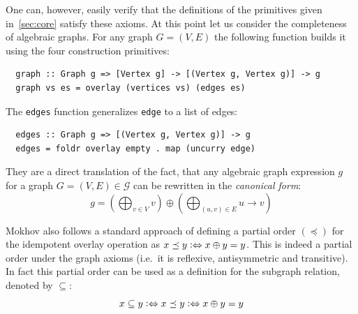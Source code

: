 \documentclass{article}
\newcommand{\hs}{\texttt}
\newcommand{\overlay}{\oplus}
\newcommand{\connect}{\rightarrow}
\begin{document}
One can, however, easily verify that the definitions of the primitives given
in~\autoref{sec:core} satisfy these axioms. At this point let us consider the
completeness of algebraic graphs. For any graph $G=(V,E)$ the following function
builds it using the four construction primitives:
\begin{verbatim}
  graph :: Graph g => [Vertex g] -> [(Vertex g, Vertex g)] -> g
  graph vs es = overlay (vertices vs) (edges es)
\end{verbatim}
The \hs{edges} function generalizes \hs{edge} to a list of edges:
\begin{verbatim}
  edges :: Graph g => [(Vertex g, Vertex g)] -> g
  edges = foldr overlay empty . map (uncurry edge)
\end{verbatim}
They are a direct translation of the fact, that any algebraic graph expression
$g$ for a graph $G=(V,E) \in \mathcal{G}$ can be rewritten in the 
\textit{canonical form}:
\[
  g = \left( \bigoplus_{v \in V} v \right) \oplus \left( \bigoplus_{(u,v) \in E}
  u \connect v \right)
\]

Mokhov also follows a standard approach of defining a partial order $(\preceq)$ for the
idempotent overlay operation as $x \preceq y \vcentcolon\Leftrightarrow x \overlay y = y$. This is indeed
a partial order under the graph axioms (i.e.\ it is reflexive, antisymmetric and
transitive). In fact this partial order can be used as a definition for
the subgraph relation, denoted by $\subseteq$:
\[
  x \subseteq y \vcentcolon\Leftrightarrow x \preceq y \vcentcolon\Leftrightarrow x \overlay y = y
\]
\end{document}
